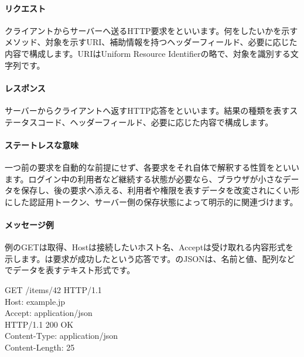 \begingroup
\begingroup
\paragraph{リクエスト}
        クライアントからサーバーへ送るHTTP要求をといいます。何をしたいかを示すメソッド、対象を示すURI、補助情報を持つヘッダーフィールド、必要に応じた内容で構成します。URIはUniform Resource Identifierの略で、対象を識別する文字列です。

\paragraph{レスポンス}
        サーバーからクライアントへ返すHTTP応答をといいます。結果の種類を表すステータスコード、ヘッダーフィールド、必要に応じた内容で構成します。

\paragraph{ステートレスな意味}
        一つ前の要求を自動的な前提にせず、各要求をそれ自体で解釈する性質をといいます。ログイン中の利用者など継続する状態が必要なら、ブラウザが小さなデータを保存し、後の要求へ添える、利用者や権限を表すデータを改変されにくい形にした認証用トークン、サーバー側の保存状態によって明示的に関連づけます。

\par
\endgroup
\medskip
\begingroup
\paragraph{メッセージ例}
        例のGETは取得、Hostは接続したいホスト名、Acceptは受け取れる内容形式を示します。は要求が成功したという応答です。のJSONは、名前と値、配列などでデータを表すテキスト形式です。
        {\ttfamily\scriptsize
        GET /items/42 HTTP/1.1\\
        Host: example.jp\\
        Accept: application/json\\[1mm]
        HTTP/1.1 200 OK\\
        Content-Type: application/json\\
        Content-Length: 25\par}

\par
\endgroup
\par
\endgroup



